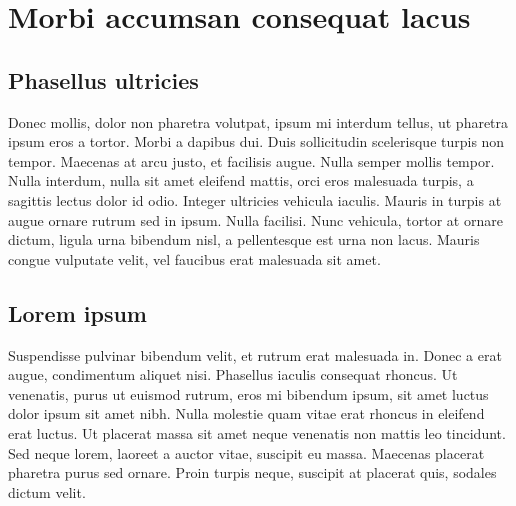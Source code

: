 \chapter{Morbi accumsan consequat lacus}
\section{Phasellus ultricies}

Donec mollis, dolor non pharetra volutpat, ipsum mi interdum tellus, ut pharetra ipsum eros a tortor. Morbi a dapibus dui. Duis sollicitudin scelerisque turpis non tempor. Maecenas at arcu justo, et facilisis augue. Nulla semper mollis tempor. Nulla interdum, nulla sit amet eleifend mattis, orci eros malesuada turpis, a sagittis lectus dolor id odio. Integer ultricies vehicula iaculis. Mauris in turpis at augue ornare rutrum sed in ipsum. Nulla facilisi. Nunc vehicula, tortor at ornare dictum, ligula urna bibendum nisl, a pellentesque est urna non lacus. Mauris congue vulputate velit, vel faucibus erat malesuada sit amet. 

\section{Lorem ipsum}

Suspendisse pulvinar bibendum velit, et rutrum erat malesuada in. Donec a erat augue, condimentum aliquet nisi. Phasellus iaculis consequat rhoncus. Ut venenatis, purus ut euismod rutrum, eros mi bibendum ipsum, sit amet luctus dolor ipsum sit amet nibh. Nulla molestie quam vitae erat rhoncus in eleifend erat luctus. Ut placerat massa sit amet neque venenatis non mattis leo tincidunt. Sed neque lorem, laoreet a auctor vitae, suscipit eu massa. Maecenas placerat pharetra purus sed ornare. Proin turpis neque, suscipit at placerat quis, sodales dictum velit. 

